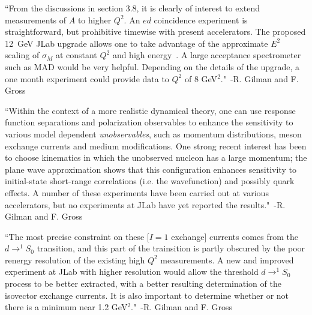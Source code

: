 ``From the discussions in section 3.8, it is clearly of interest to extend measurements of $A$ to higher $Q^2$. An $ed$ coincidence experiment is straightforward, but prohibitive timewise with present accelerators. The proposed 12~GeV JLab upgrade allows one to take advantage of the approximate $E^2$ scaling of $\sigma_M$ at constant $Q^2$ and high energy~\cite{Petratos:2002wz}. A large acceptance spectrometer such as MAD would be very helpful. Depending on the details of the upgrade, a one month experiment could provide data to $Q^2$ of 8 GeV$^2$."~-R. Gilman and F. Gross~\cite{Gilman:2001yh}

``Within the context of a more realistic dynamical theory, one can use response function separations and polarization observables to enhance the sensitivity to various model dependent \emph{unobservables}, such as momentum distributions, meson exchange currents and medium modifications. One strong recent interest has been to choose kinematics in which the unobserved nucleon has a large momentum; the plane wave approximation shows that this configuration enhances sensitivity to initial-state short-range correlations (i.e. the wavefunction) and possibly quark effects. A number of these experiments have been carried out at various accelerators, but no experiments at JLab have yet reported the results."~-R. Gilman and F. Gross~\cite{Gilman:2001yh}

``The most precise constraint on these [$I=1$ exchange] currents comes from the $d\rightarrow ^1S_0$ transition, and this part of the trainsition is partly obscured by the poor renergy resolution of the existing high $Q^2$ measurements. A new and improved experiment at JLab with higher resolution would allow the threshold $d\rightarrow ^1S_0$ process to be better extracted, with a better resulting determination of the isovector exchange currents. It is also important to determine whether or not there is a minimum near 1.2 GeV$^2$."~-R. Gilman and F. Gross~\cite{Gilman:2001yh}

